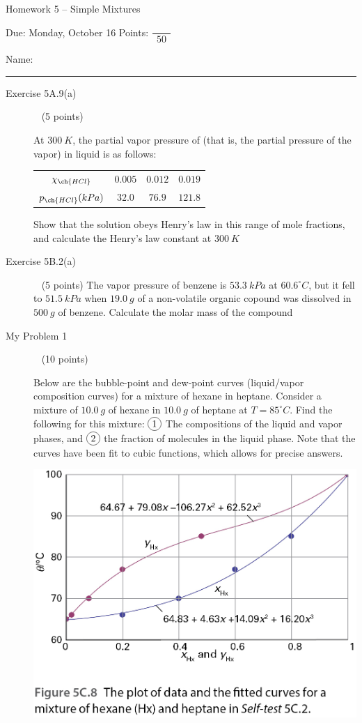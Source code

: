 \documentclass[12pt, openany, letterpaper]{memoir}
\begin{document}
\begin{center}
	{\large Homework 5 -- Simple Mixtures}
	
	Due: Monday, October 16 \hspace{3em} Points: ${\dfrac{~}{~~50~~}}$
\end{center}

Name: \rule[-.1mm]{15em}{0.1pt}

\begin{description}	
	\item [Exercise 5A.9(a)] ~ (5 points)
	
	At $300~K$, the partial vapor pressure of  (that is, the partial pressure of the  vapor) in liquid  is as follows:
	
	\begin{tabular}{c|c|c|c}
		$\chi_{\ch{HCl}}$	& 	$0.005$	&	$0.012$	&	$0.019$\\
		$p_{\ch{HCl}}(kPa)$	&	$32.0$	&	$76.9$	&	$121.8$
	\end{tabular}

	Show that the solution obeys Henry's law in this range of mole fractions, and calculate the Henry's law constant at $300~K$
	
	\vspace{15em}
	\item [Exercise 5B.2(a)] ~ (5 points)
	The vapor pressure of benzene is $53.3~kPa$ at $60.6^\circ C$, but it fell to $51.5~kPa$ when $19.0~g$ of a non-volatile organic copound was dissolved in $500~g$ of benzene. Calculate the molar mass of the compound

	
	\vspace{20em}
	\item [My Problem 1] ~ (10 points)
	
	Below are the bubble-point and dew-point curves (liquid/vapor composition curves) for a mixture of hexane in heptane. Consider a mixture of $10.0~g$ of hexane in $10.0~g$ of heptane at $T=85^\circ C$. Find the following for this mixture: $\circled{1}$ The compositions of the liquid and vapor phases, and $\circled{2}$ the fraction of molecules in the liquid phase. Note that the curves have been fit to cubic functions, which allows for precise answers.
	
	\noindent\includegraphics[width=0.5\linewidth]{Mixture_Curve}
	

\end{description}
\end{document}
